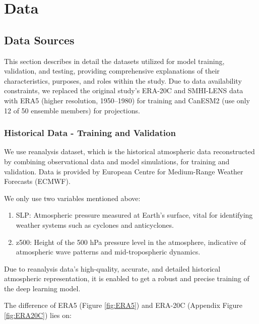 \documentclass[
]{krantz}
\providecommand{\tightlist}{%
  \setlength{\itemsep}{0pt}\setlength{\parskip}{0pt}}
\begin{document}
\section{Data}\label{data}

\subsection{Data Sources}\label{data-sources}

This section describes in detail the datasets utilized for model training, validation, and testing,
providing comprehensive explanations of their characteristics, purposes, and roles within the study.
Due to data availability constraints, we replaced the original study's ERA-20C \citep{Poli2016} and SMHI-LENS \citep{Wyser2021} data with
ERA5 \citep{ECMWF_ERA5} (higher resolution, 1950--1980) for training and CanESM2 \citep{Hua2015, CanESM2} (use only 12 of 50 ensemble members) for projections.

\subsubsection{Historical Data - Training and Validation}\label{historical-data---training-and-validation}

We use reanalysis dataset, which is the historical atmospheric data reconstructed by combining observational data and model simulations, for training and validation.
Data is provided by European Centre for Medium-Range Weather Forecasts (ECMWF).

We only use two variables mentioned above:

\begin{enumerate}
\def\labelenumi{\arabic{enumi}.}
\tightlist
\item
  SLP: Atmospheric pressure measured at Earth's surface, vital for identifying weather systems such as cyclones and anticyclones.
\item
  z500: Height of the 500 hPa pressure level in the atmosphere, indicative of atmospheric wave patterns and mid-tropospheric dynamics.
\end{enumerate}

Due to reanalysis data's high-quality, accurate, and detailed historical atmospheric representation, it is enabled to get a robust and precise training of the deep learning model.

The difference of ERA5 (Figure \ref{fig:ERA5}) and ERA-20C (Appendix Figure \ref{fig:ERA20C}) lies on:
\end{document}
